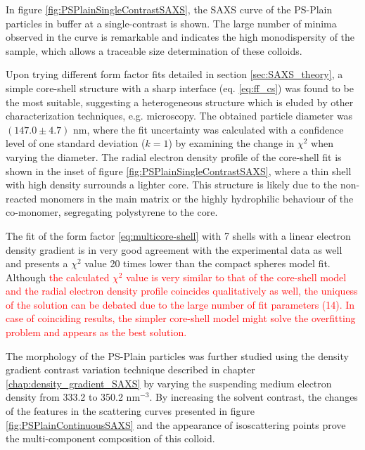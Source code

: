 In figure \ref{fig:PSPlainSingleContrastSAXS}, the SAXS curve of the PS-Plain particles in buffer at a single-contrast is shown. The large number of minima observed in the curve is remarkable and indicates the high monodispersity of the sample, which allows a traceable size determination of these colloids.

Upon trying different form factor fits detailed in section \ref{sec:SAXS_theory}, a simple core-shell structure with a sharp interface (eq. \ref{eq:ff_cs}) was found to be the most suitable, suggesting a heterogeneous structure which is eluded by other characterization techniques, e.g. microscopy. The obtained particle diameter was $(147.0\pm4.7)$ nm, where the fit uncertainty was calculated with a confidence level of one standard deviation ($k=1$) by examining the change in $\chi^2$ when varying the diameter. The radial electron density profile of the core-shell fit is shown in the inset of figure \ref{fig:PSPlainSingleContrastSAXS}, where a thin shell with high density surrounds a lighter core. This structure is likely due to the non-reacted monomers in the main matrix or the highly hydrophilic behaviour of the co-monomer, segregating polystyrene to the core.

The fit of the form factor \ref{eq:multicore-shell} with 7 shells with a linear electron density gradient is in very good agreement with the experimental data as well and presents a $\chi^2$ value 20 times lower than the compact spheres model fit. Although \textcolor{red}{the calculated $\chi^2$ value is very similar to that of the core-shell model and the radial electron density profile coincides qualitatively as well, the uniquess of the solution can be debated due to the large number of fit parameters (14). In case of coinciding results, the simpler core-shell model might solve the overfitting problem and appears as the best solution.}

The morphology of the PS-Plain particles was further studied using the density gradient contrast variation technique described in chapter \ref{chap:density_gradient_SAXS} by varying the suspending medium electron density from 333.2 to 350.2 nm$^{-3}$. By increasing the solvent contrast, the changes of the features in the scattering curves presented in figure \ref{fig:PSPlainContinuousSAXS} and the appearance of isoscattering points prove the multi-component composition of this colloid.

